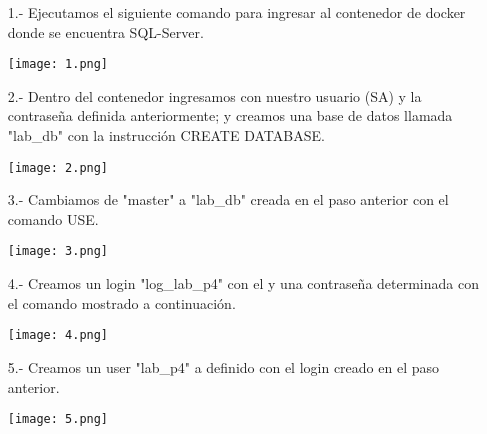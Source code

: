 \documentclass[12pt, letterpaper]{article}
\begin{document}
        \begin{itemize}
            \item[1.-]  Ejecutamos el siguiente comando para ingresar al contenedor 
                        de docker donde se encuentra SQL-Server. \vspace{.1cm}
             
                \begin{center}
                    \texttt{[image: 1.png]}    
                \end{center}

            \item[2.-]  Dentro del contenedor ingresamos con nuestro usuario (SA) 
                        y la contraseña definida anteriormente; y creamos una 
                        base de datos llamada "lab\_db" con la instrucción
                        CREATE DATABASE. \vspace{.1cm}

                \begin{center}
                    \texttt{[image: 2.png]}
                \end{center}

            \item[3.-]  Cambiamos de "master" a "lab\_db" creada en el paso anterior
                        con el comando USE.  \vspace{.1cm}
            
            \begin{center}
                \texttt{[image: 3.png]}
            \end{center}

            \item[4.-]  Creamos un login "log\_lab\_p4" con el y una contraseña
            determinada con el comando mostrado a continuación. \vspace{.1cm}
            
            \begin{center}
                \texttt{[image: 4.png]}
            \end{center}

            \item [5.-] Creamos un user "lab\_p4" a definido con el login creado 
                        en el paso anterior. \vspace{.1cm}
            
            \begin{center}
                \texttt{[image: 5.png]}
            \end{center}


\end{itemize}
\end{document}
